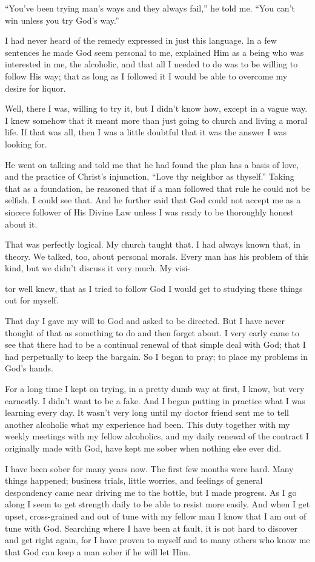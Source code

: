 “You’ve been trying man’s ways and they always fail,” he told me. “You can’t win unless you try God’s way.”

I had never heard of the remedy expressed in just this language. In a few sentences he made God seem personal to me, explained Him as a being who was interested in me, the alcoholic, and that all I needed to do was to be willing to follow His way; that as long as I followed it I would be able to overcome my desire for liquor.

Well, there I was, willing to try it, but I didn’t know how, except in a vague way. I knew somehow that it meant more than just going to church and living a moral life. If that was all, then I was a little doubtful that it was the answer I was looking for.

He went on talking and told me that he had found the plan has a basis of love, and the practice of Christ’s injunction, “Love thy neighbor as thyself.” Taking that as a foundation, he reasoned that if a man followed that rule he could not be selfish. I could see that. And he further said that God could not accept me as a sincere follower of His Divine Law unless I was ready to be thoroughly honest about it.

That was perfectly logical. My church taught that. I had always known that, in theory. We talked, too, about personal morals. Every man has his problem of this kind, but we didn’t discuss it very much. My visi-

tor well knew, that as I tried to follow God I would get to studying these things out for myself.

That day I gave my will to God and asked to be directed. But I have never thought of that as something to do and then forget about. I very early came to see that there had to be a continual renewal of that simple deal with God; that I had perpetually to keep the bargain. So I began to pray; to place my problems in God’s hands.

For a long time I kept on trying, in a pretty dumb way at first, I know, but very earnestly. I didn’t want to be a fake. And I began putting in practice what I was learning every day. It wasn’t very long until my doctor friend sent me to tell another alcoholic what my experience had been. This duty together with my weekly meetings with my fellow alcoholics, and my daily renewal of the contract I originally made with God, have kept me sober when nothing else ever did.

I have been sober for many years now. The first few months were hard. Many things happened; business trials, little worries, and feelings of general despondency came near driving me to the bottle, but I made progress. As I go along I seem to get strength daily to be able to resist more easily. And when I get upset, cross-grained and out of tune with my fellow man I know that I am out of tune with God. Searching where I have been at fault, it is not hard to discover and get right again, for I have proven to myself and to many others who know me that God can keep a man sober if he will let Him.

